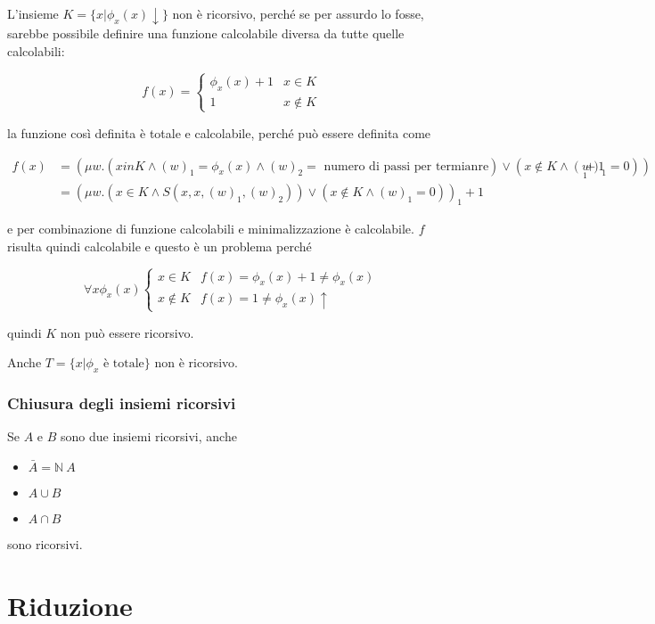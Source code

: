 L'insieme $ K = \{ x | \phi_x(x)\downarrow \} $ non è ricorsivo, perché se per assurdo lo fosse, sarebbe possibile definire una funzione calcolabile diversa da tutte quelle calcolabili:

$$
f(x) = \begin{cases}
\phi_x(x)+1 &x \in K \\
1 & x \notin K
\end{cases}
$$

la funzione così definita è totale e calcolabile, perché può essere definita come 

\begin{align*}
f(x) &= (\mu w. (x in K \wedge (w)_1 = \phi_x(x) \wedge (w)_2 = \text{ numero di passi per termianre}) \vee (x \notin K \wedge (w)_1 = 0))_1 +1 \\
&= (\mu w. (x \in K \wedge S(x,x,(w)_1, (w)_2)) \vee (x \notin K \wedge (w)_1 = 0))_1 +1
\end{align*}

e per combinazione di funzione calcolabili e minimalizzazione è calcolabile. $f$ risulta quindi calcolabile e questo è un problema perché

$$
\forall x \phi_x(x) \begin{cases}
x \in K & f(x) = \phi_x(x) +1 \neq \phi_x(x) \\
x \notin K & f(x) = 1 \neq \phi_x(x)\uparrow
\end{cases}
$$

quindi $ K $ non può essere ricorsivo.

Anche $T = \{x |  \phi_x \text{ è totale}\}$ non è ricorsivo.

\subsubsection{Chiusura degli insiemi ricorsivi}

Se $ A $ e $ B $ sono due insiemi ricorsivi, anche

\begin{itemize}
	\item $ \bar{A} = \mathbb{N} \ A$
	\item $ A \cup B $
	\item $ A \cap B$
\end{itemize} 

sono ricorsivi.

\section{Riduzione}

